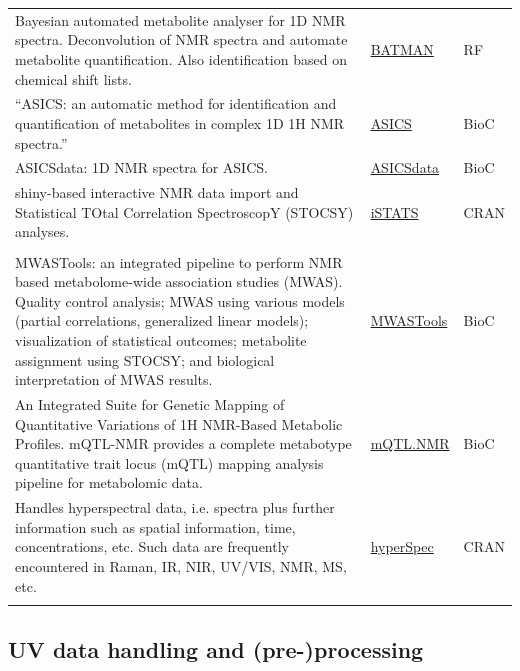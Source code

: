 \documentclass[]{article}
\begin{document}
\begin{longtable}{>{\raggedright\arraybackslash}p{30em}>{\raggedright\arraybackslash}p{10em}>{\raggedright\arraybackslash}p{3em}}
\rowcolor{gray!6}  Bayesian automated metabolite analyser for 1D NMR spectra. Deconvolution of NMR spectra and automate metabolite quantification. Also identification based on chemical shift lists. & \href{http://batman.r-forge.r-project.org/}{BATMAN} & RF\\
“ASICS: an automatic method for identification and quantification of metabolites in complex 1D 1H NMR spectra.” & \href{https://bioconductor.org/packages/release/bioc/html/ASICS.html}{ASICS} & BioC\\
\rowcolor{gray!6}  ASICSdata: 1D NMR spectra for ASICS. & \href{https://www.bioconductor.org/packages/release/data/experiment/vignettes/ASICSdata/inst/doc/ASICSdata.html}{ASICSdata} & BioC\\
shiny-based interactive NMR data import and Statistical TOtal Correlation SpectroscopY (STOCSY) analyses. & \href{https://cran.r-project.org/package=iSTATS}{iSTATS} & CRAN\\
\rowcolor{gray!6}  \addlinespace[0.3em]
\multicolumn{3}{l}{\textbf{NMR and integration with Genomics}}\\
MWASTools: an integrated pipeline to perform NMR based metabolome-wide association studies (MWAS). Quality control analysis; MWAS using various models (partial correlations, generalized linear models); visualization of statistical outcomes; metabolite assignment using STOCSY; and biological interpretation of MWAS results. & \href{https://bioconductor.org/packages/release/bioc/html/MWASTools.html}{MWASTools} & BioC\\
An Integrated Suite for Genetic Mapping of Quantitative Variations of 1H NMR-Based Metabolic Profiles. mQTL-NMR provides a complete metabotype quantitative trait locus (mQTL) mapping analysis pipeline for metabolomic data. & \href{https://doi.org/doi:10.18129/B9.bioc.mQTL.NMR}{mQTL.NMR} & BioC\\
\rowcolor{gray!6}  Handles hyperspectral data, i.e. spectra plus further information such as spatial information, time, concentrations, etc. Such data are frequently encountered in Raman, IR, NIR, UV/VIS, NMR, MS, etc. & \href{https://cran.r-project.org/package=ChemoSpec}{hyperSpec} & CRAN\\*
\end{longtable}

\newpage

\hypertarget{uv-data-handling-and-pre-processing}{%
\subsection{UV data handling and (pre-)processing}\label{uv-data-handling-and-pre-processing}}
\end{document}
